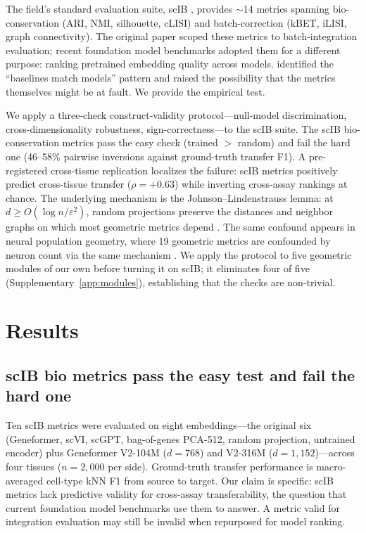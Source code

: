 \documentclass[11pt]{article}
\begin{document}
The field's standard evaluation suite, scIB \citep{luecken2022scib}, provides $\sim$14 metrics spanning bio-conservation (ARI, NMI, silhouette, cLISI) and batch-correction (kBET, iLISI, graph connectivity). The original paper scoped these metrics to batch-integration evaluation; recent foundation model benchmarks \citep{wu2025scfm, vcbench2026, unifiedscfm2026, cellxgeneintegration2026} adopted them for a different purpose: ranking pretrained embedding quality across models. \citet{wu2025scfm} identified the ``baselines match models'' pattern and raised the possibility that the metrics themselves might be at fault. We provide the empirical test.

We apply a three-check construct-validity protocol---null-model discrimination, cross-dimensionality robustness, sign-correctness---to the scIB suite. The scIB bio-conservation metrics pass the easy check (trained $>$ random) and fail the hard one (46--58\% pairwise inversions against ground-truth transfer F1). A pre-registered cross-tissue replication localizes the failure: scIB metrics positively predict cross-tissue transfer ($\rho = +0.63$) while inverting cross-assay rankings at chance. The underlying mechanism is the Johnson--Lindenstrauss lemma: at $d \geq O(\log n / \varepsilon^2)$, random projections preserve the distances and neighbor graphs on which most geometric metrics depend \citep{johnsonlindenstrauss1984}. The same confound appears in neural population geometry, where 19 geometric metrics are confounded by neuron count via the same mechanism \citep{tower2026bracket}. We apply the protocol to five geometric modules of our own before turning it on scIB; it eliminates four of five (Supplementary~\ref{app:modules}), establishing that the checks are non-trivial.


\section{Results}

\subsection{scIB bio metrics pass the easy test and fail the hard one}
\label{sec:scib}

Ten scIB metrics were evaluated on eight embeddings---the original six (Geneformer, scVI, scGPT, bag-of-genes PCA-512, random projection, untrained encoder) plus Geneformer V2-104M ($d = 768$) and V2-316M ($d = 1{,}152$)---across four tissues ($n = 2{,}000$ per side). Ground-truth transfer performance is macro-averaged cell-type kNN F1 from source to target. Our claim is specific: scIB metrics lack predictive validity for cross-assay transferability, the question that current foundation model benchmarks use them to answer. A metric valid for integration evaluation may still be invalid when repurposed for model ranking.
\end{document}
